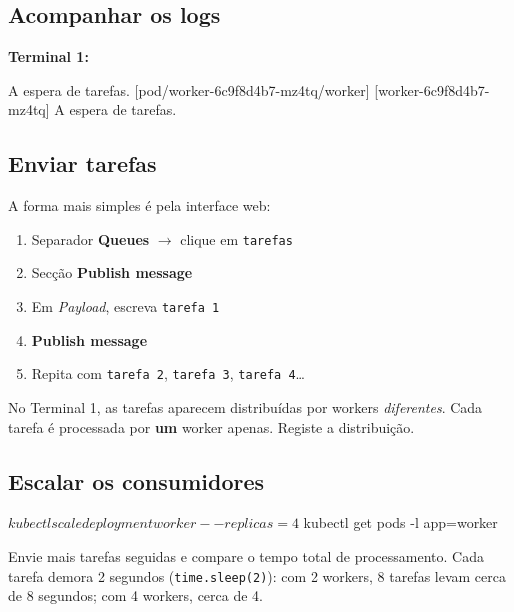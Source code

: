 \documentclass[11pt,a4paper]{article}
\begin{document}
\subsection{Acompanhar os logs}

\textbf{Terminal 1:}

\begin{saida}
 A espera de tarefas.
[pod/worker-6c9f8d4b7-mz4tq/worker] [worker-6c9f8d4b7-mz4tq] A espera de tarefas.
\end{saida}

\subsection{Enviar tarefas}

A forma mais simples é pela interface web:

\begin{enumerate}
  \item Separador \textbf{Queues} $\rightarrow$ clique em \texttt{tarefas}
  \item Secção \textbf{Publish message}
  \item Em \emph{Payload}, escreva \texttt{tarefa 1}
  \item \textbf{Publish message}
  \item Repita com \texttt{tarefa 2}, \texttt{tarefa 3}, \texttt{tarefa 4}\ldots
\end{enumerate}

\begin{verificar}
No Terminal 1, as tarefas aparecem distribuídas por workers \emph{diferentes}. Cada tarefa é processada por \textbf{um} worker apenas. Registe a distribuição.
\end{verificar}

\subsection{Escalar os consumidores}

\begin{terminal}
$ kubectl scale deployment worker --replicas=4
$ kubectl get pods -l app=worker
\end{terminal}

Envie mais tarefas seguidas e compare o tempo total de processamento. Cada tarefa demora 2 segundos (\texttt{time.sleep(2)}): com 2 workers, 8 tarefas levam cerca de 8 segundos; com 4 workers, cerca de 4.
\end{document}
